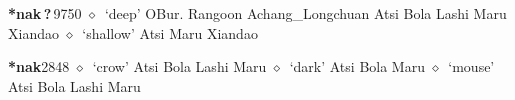  \begin{list}{}{\leftmargin=1.5em \itemindent=-1.5em}
  \item {\footnotesize \textbf{*nak\,?\,}}{\tiny 9750}
         $\diamond$~`deep'
         OBur. 
\hspace{1ex}
         Rangoon 
\hspace{1ex}
         Achang\_Longchuan 
\hspace{1ex}
         Atsi 
\hspace{1ex}
         Bola 
\hspace{1ex}
         Lashi 
\hspace{1ex}
         Maru 
\hspace{1ex}
         Xiandao 
\hspace{1ex}
         $\diamond$~`shallow'
         Atsi 
\hspace{1ex}
         Maru 
\hspace{1ex}
         Xiandao 
  \item {\footnotesize \textbf{*nak}}{\tiny 2848}
\hspace{1ex}
         $\diamond$~`crow'
         Atsi 
\hspace{1ex}
         Bola 
\hspace{1ex}
         Lashi 
\hspace{1ex}
         Maru 
\hspace{1ex}
         $\diamond$~`dark'
         Atsi 
\hspace{1ex}
         Bola 
\hspace{1ex}
         Maru 
\hspace{1ex}
         $\diamond$~`mouse'
         Atsi 
\hspace{1ex}
         Bola 
\hspace{1ex}
         Lashi 
\hspace{1ex}
         Maru 

\end{list}
